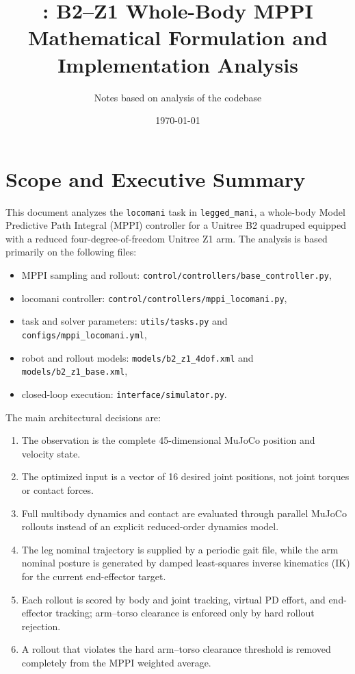 \documentclass[11pt,a4paper]{article}
\title{\code{legged\_mani}: B2--Z1 Whole-Body MPPI\\
Mathematical Formulation and Implementation Analysis}
\author{Notes based on analysis of the \code{legged\_mani} codebase}
\date{\today}
\newcommand{\code}[1]{\texttt{#1}}
\begin{document}
\maketitle
\tableofcontents
\newpage

\section{Scope and Executive Summary}

This document analyzes the \code{locomani} task in \code{legged\_mani}, a
whole-body Model Predictive Path Integral (MPPI) controller for a Unitree B2
quadruped equipped with a reduced four-degree-of-freedom Unitree Z1 arm. The
analysis is based primarily on the following files:
\begin{itemize}
  \item MPPI sampling and rollout:
        \code{control/controllers/base\_controller.py},
  \item locomani controller:
        \code{control/controllers/mppi\_locomani.py},
  \item task and solver parameters:
        \code{utils/tasks.py} and \code{configs/mppi\_locomani.yml},
  \item robot and rollout models:
        \code{models/b2\_z1\_4dof.xml} and \code{models/b2\_z1\_base.xml},
  \item closed-loop execution:
        \code{interface/simulator.py}.
\end{itemize}

The main architectural decisions are:
\begin{enumerate}
  \item The observation is the complete 45-dimensional MuJoCo position and
        velocity state.
  \item The optimized input is a vector of 16 desired joint positions, not
        joint torques or contact forces.
  \item Full multibody dynamics and contact are evaluated through parallel
        MuJoCo rollouts instead of an explicit reduced-order dynamics model.
  \item The leg nominal trajectory is supplied by a periodic gait file, while
        the arm nominal posture is generated by damped least-squares inverse
        kinematics (IK) for the current end-effector target.
  \item Each rollout is scored by body and joint tracking, virtual PD effort,
        and end-effector tracking; arm--torso clearance is enforced only by
        hard rollout rejection.
  \item A rollout that violates the hard arm--torso clearance threshold is
        removed completely from the MPPI weighted average.
\end{enumerate}
\end{document}
